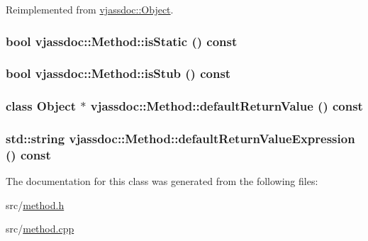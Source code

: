Reimplemented from \hyperlink{classvjassdoc_1_1Object_b3729c3b063682f94b43a42546c90e96}{vjassdoc::Object}.\hypertarget{classvjassdoc_1_1Method_2e54844815dda9eef31bbe4e6fc4c67b}{
\subsubsection{\setlength{\rightskip}{0pt plus 5cm}bool vjassdoc::Method::isStatic () const}}
\label{classvjassdoc_1_1Method_2e54844815dda9eef31bbe4e6fc4c67b}


\hypertarget{classvjassdoc_1_1Method_57b35b4da03b3004ce983ea3e19a121e}{
\subsubsection{\setlength{\rightskip}{0pt plus 5cm}bool vjassdoc::Method::isStub () const}}
\label{classvjassdoc_1_1Method_57b35b4da03b3004ce983ea3e19a121e}


\hypertarget{classvjassdoc_1_1Method_90730e7a0393fd3a7936c3b181f5a4c0}{
\subsubsection{\setlength{\rightskip}{0pt plus 5cm}class {\bf Object} $\ast$ vjassdoc::Method::defaultReturnValue () const}}
\label{classvjassdoc_1_1Method_90730e7a0393fd3a7936c3b181f5a4c0}


\hypertarget{classvjassdoc_1_1Method_2601819a6deea5970da2cac5b83bb8b0}{
\subsubsection{\setlength{\rightskip}{0pt plus 5cm}std::string vjassdoc::Method::defaultReturnValueExpression () const}}
\label{classvjassdoc_1_1Method_2601819a6deea5970da2cac5b83bb8b0}




The documentation for this class was generated from the following files:\begin{CompactItemize}
\item 
src/\hyperlink{method_8h}{method.h}\item 
src/\hyperlink{method_8cpp}{method.cpp}\end{CompactItemize}
